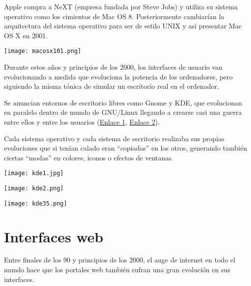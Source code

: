 Apple compra a NeXT (empresa fundada por Steve Jobs) y utiliza su sistema operativo como los cimientos de Mac OS 8. Posteriormente cambiarían la arquitectura del sistema operativo para ser de estilo UNIX y así presentar Mac OS X en 2001.

\vspace{-10pt}
\begin{center}
    \texttt{[image: macosx101.png]}
\end{center}


Durante estos años y principios de los 2000, los interfaces de usuario van evolucionando a medida que evoluciona la potencia de los ordenadores, pero siguiendo la misma tónica de simular un escritorio real en el ordenador.

Se anuncian entornos de escritorio libres como Gnome y KDE, que evolucionan en paralelo dentro de mundo de GNU/Linux llegando a crearse casi una guerra entre ellos y entre los usuarios (\href{https://www.zdnet.com/article/gnome-vs-kde-this-means-war/}{Enlace 1}, \href{https://www.linux.com/news/kde-and-gnome-war/}{Enlace 2}).

Cada sistema operativo y cada sistema de escritorio realizaba sus propias evoluciones que si tenían calado eran “copiadas” en los otros, generando también ciertas “modas” en colores, iconos o efectos de ventanas.

{
    \begin{minipage}{0.32\linewidth}
        \texttt{[image: kde1.jpg]}
    \end{minipage}
    \hfill
    \begin{minipage}{0.32\linewidth}
        \texttt{[image: kde2.png]}
    \end{minipage}
    \hfill
    \begin{minipage}{0.32\linewidth}
        \texttt{[image: kde35.png]}
    \end{minipage}
}


\section{Interfaces web}

Entre finales de los 90 y principios de los 2000, el auge de internet en todo el mundo hace que los portales web también sufran una gran evolución en sus interfaces.


